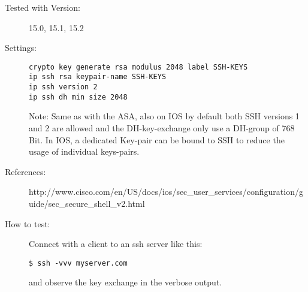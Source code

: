 \begin{description}
\item[Tested with Version:] 15.0, 15.1, 15.2

\item[Settings:] \mbox{}
\begin{lstlisting}[breaklines]
crypto key generate rsa modulus 2048 label SSH-KEYS
ip ssh rsa keypair-name SSH-KEYS
ip ssh version 2
ip ssh dh min size 2048
\end{lstlisting}
Note: Same as with the ASA, also on IOS by default both SSH versions 1 and 2 are allowed and the DH-key-exchange only use a DH-group of 768 Bit.
In IOS, a dedicated Key-pair can be bound to SSH to reduce the usage of individual keys-pairs.

\item[References:]
http://www.cisco.com/en/US/docs/ios/sec\_user\_services/configuration/guide/sec\_secure\_shell\_v2.html 


\item[How to test:]
Connect with a client to an ssh server like this: \\
\begin{lstlisting}[breaklines]
$ ssh -vvv myserver.com
\end{lstlisting}and observe the key exchange in the verbose output.
\end{description}

